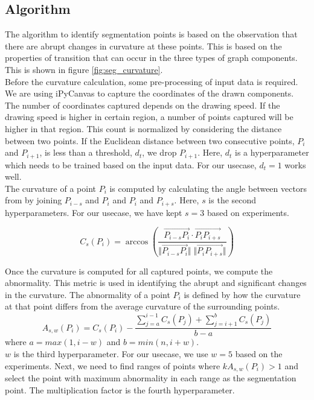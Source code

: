 \subsection{Algorithm}
The algorithm to identify segmentation points is based on the observation that there are abrupt changes in curvature at these points. This is based on the properties of transition that can occur in the three types of graph components. This is shown in figure \ref{fig:seg_curvature}.\\

Before the curvature calculation, some pre-processing of input data is required. We are using iPyCanvas to capture the coordinates of the drawn components. The number of coordinates captured depends on the drawing speed. If the drawing speed is higher in certain region, a number of points captured will be higher in that region. This count is normalized by considering the distance between two points. If the Euclidean distance between two consecutive points, $P_i$ and $P_{i+1}$, is less than a threshold, $d_t$, we drop $P_{i+1}$. Here, $d_t$ is a hyperparameter which needs to be trained based on the input data. For our usecase, $d_t = 1$ works well.\\

The curvature of a point $P_i$ is computed by calculating the angle between vectors from by joining $P_{i-s}$ and $P_i$ and $P_i$ and $P_{i+s}$. Here, $s$ is the second hyperparameters. For our usecase, we have kept $s=3$ based on experiments.

\begin{equation}
	C_s(P_i) = \arccos \left(  \frac{\overrightarrow{P_{i-s} P_i} \cdot \overrightarrow{P_i P_{i+s}}}{ \Vert \overrightarrow{P_{i-s} P_i}  \Vert \; \Vert \overrightarrow{P_i P_{i+s}} \Vert  } \right) 
\end{equation} 

Once the curvature is computed for all captured points, we compute the abnormality. This metric is used in identifying the abrupt and significant changes in the curvature. The abnormality of a point $P_i$ is defined by how the curvature at that point differs from the average curvature of the surrounding points.
\begin{equation}
	A_{s,w}(P_i) = C_s(P_i) - \frac{\sum_{j=a}^{i-1} C_s(P_j) + \sum_{j=i+1}^{b} C_s(P_j)}{b - a}
\end{equation}
where $a = max(1, i-w)$ and $b = min(n, i+w)$.\\

$w$ is the third hyperparameter. For our usecase, we use $w=5$ based on the experiments. Next, we need to find ranges of points where $k A_{s, w}(P_i) > 1$ and select the point with maximum abnormality in each range as the segmentation point. The multiplication factor is the fourth hyperparameter.\\

